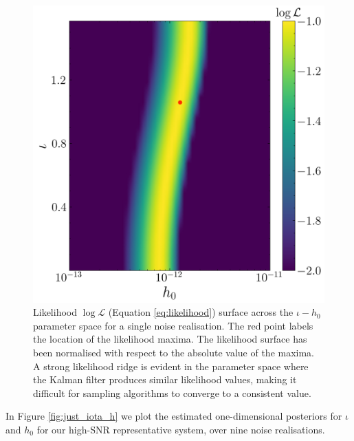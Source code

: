 \documentclass[fleqn,usenatbib,useAMS]{mnras}
\begin{document}
\begin{figure}
	\centering
	\includegraphics[width=\columnwidth]{images/likelihood_surface}
	\caption{Likelihood $\log \mathcal{L}$ (Equation \ref{eq:likelihood}) surface across the $\iota - h_0$ parameter space for a single noise realisation. The red point labels the location of the likelihood maxima. The likelihood surface has been normalised with respect to the absolute value of the maxima. A strong likelihood ridge is evident in the parameter space where the Kalman filter produces similar likelihood values, making it difficult for sampling algorithms to converge to a consistent value.}
	\label{fig:likelihood_surface}
\end{figure}
In Figure \ref{fig:just_iota_h} we plot the estimated one-dimensional posteriors for $\iota$ and $h_0$ for our high-SNR representative system, over nine noise realisations. 
\end{document}
